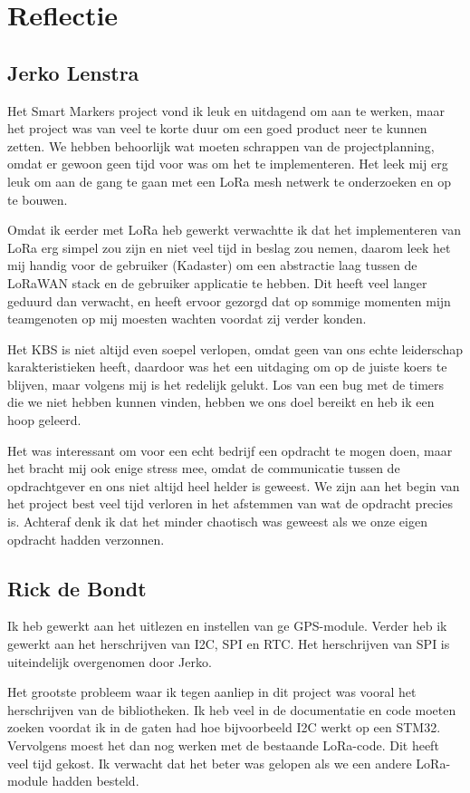 \section{Reflectie}

\subsection{Jerko Lenstra}
Het Smart Markers project vond ik leuk en uitdagend om aan te werken, maar het
project was van veel te korte duur om een goed product neer te kunnen zetten.
We hebben behoorlijk wat moeten schrappen van de projectplanning, omdat er gewoon
geen tijd voor was om het te implementeren. Het leek mij erg leuk om aan de gang
te gaan met een LoRa mesh netwerk te onderzoeken en op te bouwen.

Omdat ik eerder met LoRa heb gewerkt verwachtte ik dat het implementeren van LoRa
erg simpel zou zijn en niet veel tijd in beslag zou nemen, daarom leek het mij
handig voor de gebruiker (Kadaster) om een abstractie laag tussen de LoRaWAN stack
en de gebruiker applicatie te hebben. Dit heeft veel langer geduurd dan verwacht,
en heeft ervoor gezorgd dat op sommige momenten mijn teamgenoten op mij moesten
wachten voordat zij verder konden.

Het KBS is niet altijd even soepel verlopen, omdat geen van ons echte leiderschap
karakteristieken heeft, daardoor was het een uitdaging om op de juiste koers te
blijven, maar volgens mij is het redelijk gelukt. Los van een bug met de timers
die we niet hebben kunnen vinden, hebben we ons doel bereikt en heb ik een hoop
geleerd.

Het was interessant om voor een echt bedrijf een opdracht te mogen doen, maar het
bracht mij ook enige stress mee, omdat de communicatie tussen de opdrachtgever en
ons niet altijd heel helder is geweest. We zijn aan het begin van het project best
veel tijd verloren in het afstemmen van wat de opdracht precies is. Achteraf denk
ik dat het minder chaotisch was geweest als we onze eigen opdracht hadden verzonnen.

\subsection{Rick de Bondt}
Ik heb gewerkt aan het uitlezen en instellen van ge GPS-module. Verder heb ik
gewerkt aan het herschrijven van I2C, SPI en RTC. Het herschrijven van SPI is
uiteindelijk overgenomen door Jerko.

Het grootste probleem waar ik tegen aanliep in dit project was vooral het
herschrijven van de bibliotheken. Ik heb veel in de documentatie en code moeten
zoeken voordat ik in de gaten had hoe bijvoorbeeld I2C werkt op een STM32.
Vervolgens moest het dan nog werken met de bestaande LoRa-code. Dit heeft veel
tijd gekost. Ik verwacht dat het beter was gelopen als we een andere LoRa-module
hadden besteld.

